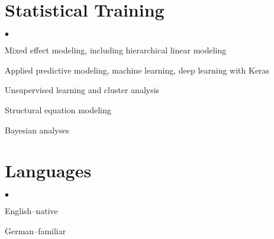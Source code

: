 \documentclass[margin,line]{res}
\newenvironment{list2}{
  \begin{list}{$\bullet$}{%
      \setlength{\itemsep}{0in}
      \setlength{\parsep}{0in} \setlength{\parskip}{0in}
      \setlength{\topsep}{0in} \setlength{\partopsep}{0in} 
      \setlength{\leftmargin}{0.2in}}}{\end{list}}
\begin{document}
\begin{resume}
\section{\sc Statistical Training}
\begin{list2}
\item Mixed effect modeling, including hierarchical linear modeling
\item Applied predictive modeling, machine learning, deep learning with Keras
\item Unsupervised learning and cluster analysis
\item Structural equation modeling
\item Bayesian analyses
\end{list2}

\vspace{-2mm}
\section{\sc Languages}

\begin{list2}
\item English--native
\item German--familiar
\end{list2}


\end{resume}
\end{document}
